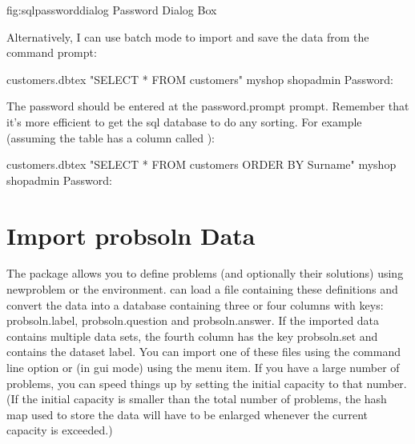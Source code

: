 \FloatFig
 {fig:sqlpassworddialog}
 {%
 }
 {Password Dialog Box}

   Alternatively, I can use batch mode to import and save the data 
   from the command prompt:

\begin{terminal}
  customers.dbtex  "SELECT * FROM customers" \continueline
{} myshop  shopadmin
Password:
\end{terminal}

   \ContExplan The password should be entered at the \gls{password.prompt}
   prompt. Remember that it's more efficient to get the \gls{sql}
   database to do any sorting. For example (assuming the table has 
   a column called ):
\begin{terminal}
  customers.dbtex  "SELECT * FROM customers ORDER BY \continueline
Surname"  myshop  shopadmin
Password:
\end{terminal}

\section{Import probsoln Data}\label{sec:importprobsoln}

   The  package allows you to define problems (and 
   optionally their solutions) using \gls{newproblem} or the
    environment.  can load a file
   containing these definitions and convert the  data
   into a  database containing three or four columns
   with keys: \gls{probsoln.label}, 
   \gls{probsoln.question} and
   \gls{probsoln.answer}. If the imported data contains
   multiple  data sets, the fourth column has the
   key \gls{probsoln.set} and contains the dataset label. 
   You can import one of these
   files using the  command line option or (in
   \gls{gui} mode) using the 
   menu item. If you have a large number of problems, you can speed things
   up by setting the initial capacity to that number. (If the initial
   capacity is smaller than the total number of problems, the hash map
   used to store the data will have to be enlarged whenever the current
   capacity is exceeded.)

